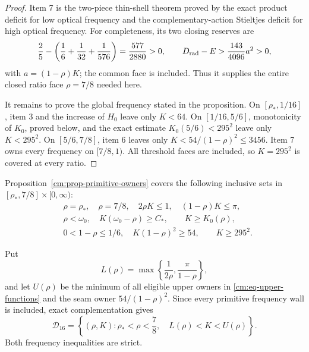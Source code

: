 \documentclass[11pt]{article}
\numberwithin{equation}{section}
\theoremstyle{definition}
\theoremstyle{remark}
\begin{document}
\begin{proof}
Item 7 is the two-piece thin-shell theorem proved by the exact product
deficit for low optical frequency and the complementary-action Stieltjes
deficit for high optical frequency.  For completeness, its two closing
reserves are
\[
 \frac25-\left(\frac16+\frac1{32}+\frac1{576}\right)
 =\frac{577}{2880}>0,
 \qquad
 D_{\rm rad}-E>\frac{143}{4096}a^2>0,
\]
with \(a=(1-\rho)K\); the common face is included.  Thus it supplies the
entire closed ratio face \(\rho=7/8\) needed here.

It remains to prove the global frequency stated in the proposition.  On
\([\rho_*,1/16]\), item 3 and the increase of \(H_0\) leave only
\(K<64\).  On
\([1/16,5/6]\), monotonicity of \(K_0\), proved below, and the exact
estimate \(K_0(5/6)<295^2\) leave only \(K<295^2\).  On
\([5/6,7/8]\), item 6 leaves only
\(K<54/(1-\rho)^2\leq3456\).  Item 7 owns every frequency on
\([7/8,1)\).  All threshold faces are included, so \(K=295^2\) is
covered at every ratio.
\end{proof}

Proposition~\ref{cm:prop-primitive-owners} covers the following inclusive
sets in \([\rho_*,7/8]\times[0,\infty)\):
\begin{align*}
 &\rho=\rho_*,\quad \rho=7/8,\quad 2\rho K\leq1,
 \quad (1-\rho)K\leq\pi,\\
 &\rho<\omega_0,\quad K(\omega_0-\rho)\geq C_*,
 \qquad K\geq K_0(\rho),\\
 &0<1-\rho\leq1/6,\quad K(1-\rho)^2\geq54,
 \qquad K\geq295^2.
\end{align*}

Put
\[
 L(\rho)=\max\left\{\frac1{2\rho},\frac\pi{1-\rho}\right\},
\]
and let \(U(\rho)\) be the minimum of all eligible upper owners in
\eqref{cm:eq-upper-functions} and the seam owner \(54/(1-\rho)^2\).
Since every primitive frequency wall is included, exact complementation
gives
\begin{equation}
 \mathcal D_{16}=
 \left\{(\rho,K):\rho_*<\rho<\frac78,\quad
 L(\rho)<K<U(\rho)\right\}.
 \label{cm:eq-D16}
\end{equation}
Both frequency inequalities are strict.
\end{document}
